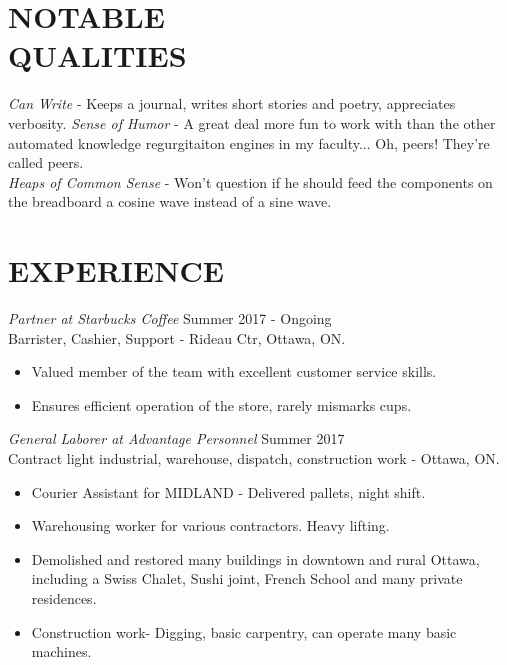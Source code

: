 \documentclass[margin]{res}
\begin{document}
\begin{resume}
\section{NOTABLE \\ QUALITIES} 

{\sl Can Write} - Keeps a journal, writes short stories and poetry, appreciates verbosity.
{\sl Sense of Humor} - A great deal more fun to work with than the other automated knowledge regurgitaiton engines in my faculty... Oh, peers! They're called peers. \\
{\sl Heaps of Common Sense} - Won't question if he should feed the components on the breadboard a cosine wave instead of a sine wave. \\

\section{EXPERIENCE} {\sl Partner at Starbucks Coffee} \hfill Summer 2017 - Ongoing \\
                Barrister, Cashier, Support - Rideau Ctr, Ottawa, ON.
                 \begin{itemize}  \itemsep -2pt %
                 \item Valued member of the team with excellent customer service skills. 
                \item  Ensures efficient operation of the store, rarely mismarks cups.
                \end{itemize}
 
 {\sl General Laborer at Advantage Personnel} \hfill    Summer 2017 \\
                Contract light industrial, warehouse, dispatch, construction work - Ottawa, ON.
                 \begin{itemize}  \itemsep -2pt %
                 \item Courier Assistant for MIDLAND - Delivered pallets, night shift.
                 \item Warehousing worker for various contractors. Heavy lifting.
                 \item Demolished and restored many buildings in downtown and rural Ottawa, including a Swiss Chalet, Sushi joint, French School and many private residences.
\item Construction work- Digging, basic carpentry, can operate many basic machines.                 
                 \end{itemize} 
 

\end{resume}
\end{document}
